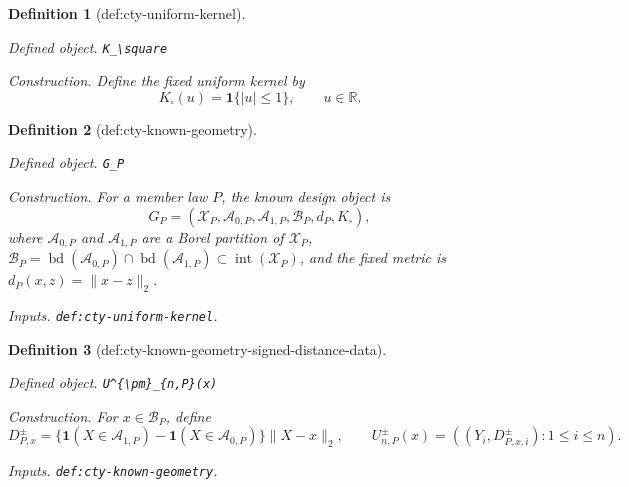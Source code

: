 \documentclass{article}
\newtheorem{definition}{Definition}
\begin{document}
\begin{definition}[def:cty-uniform-kernel]\label{def:cty-uniform-kernel}
\par\smallskip\noindent\emph{Defined object.} \texttt{K\_\allowbreak{}\textbackslash{}\allowbreak{}square}
\par\smallskip\noindent\emph{Construction.} Define the fixed uniform kernel by
\[
 K_\square(u)=\mathbf 1\{|u|\leq1\},\qquad u\in\mathbb R.
\]
\end{definition}

\begin{definition}[def:cty-known-geometry]\label{def:cty-known-geometry}
\par\smallskip\noindent\emph{Defined object.} \texttt{G\_\allowbreak{}P}
\par\smallskip\noindent\emph{Construction.} For a member law \(P\), the known design object is
\[
 G_P=(\mathcal X_P,\mathcal A_{0,P},\mathcal A_{1,P},\mathcal B_P,d_P,K_\square),
\]
where \(\mathcal A_{0,P}\) and \(\mathcal A_{1,P}\) are a Borel partition of \(\mathcal X_P\), \(\mathcal B_P=\operatorname{bd}(\mathcal A_{0,P})\cap\operatorname{bd}(\mathcal A_{1,P})\subset\operatorname{int}(\mathcal X_P)\), and the fixed metric is \(d_P(x,z)=\lVert x-z\rVert_2\).
\par\smallskip\noindent\emph{Inputs.} \texttt{def:\allowbreak{}cty-\allowbreak{}uniform-\allowbreak{}kernel}.
\end{definition}

\begin{definition}[def:cty-known-geometry-signed-distance-data]\label{def:cty-known-geometry-signed-distance-data}
\par\smallskip\noindent\emph{Defined object.} \texttt{U\textasciicircum{}\{\textbackslash{}\allowbreak{}pm\}\allowbreak{}\_\allowbreak{}\{n,\allowbreak{}P\}\allowbreak{}(x)}
\par\smallskip\noindent\emph{Construction.} For \(x\in\mathcal B_P\), define
\[
 D^{\pm}_{P,x}=\{\mathbf 1(X\in\mathcal A_{1,P})-\mathbf 1(X\in\mathcal A_{0,P})\}\lVert X-x\rVert_2,
 \qquad
 U^{\pm}_{n,P}(x)=((Y_i,D^{\pm}_{P,x,i}):1\leq i\leq n).
\]
\par\smallskip\noindent\emph{Inputs.} \texttt{def:\allowbreak{}cty-\allowbreak{}known-\allowbreak{}geometry}.
\end{definition}
\end{document}
